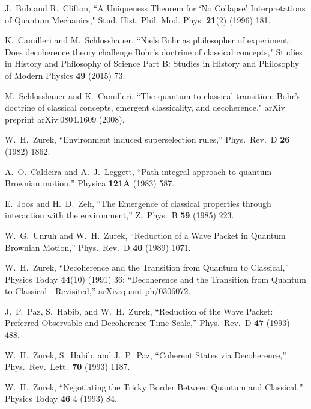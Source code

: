 \documentclass[12pt]{article}
\theoremstyle{plain}
\theoremstyle{definition}
\theoremstyle{remark}
\begin{document}
\begin{thebibliography}{99}
J.~Bub and R.~Clifton, ``A Uniqueness Theorem for `No Collapse' Interpretations of Quantum Mechanics," Stud. Hist. Phil. Mod. Phys. {\bf 21}(2) (1996) 181.


K.~Camilleri and M.~Schlosshauer, ``Niels Bohr as philosopher of experiment: Does decoherence theory challenge Bohr's doctrine of classical concepts," Studies in History and Philosophy of Science Part B: Studies in History and Philosophy of Modern Physics {\bf49} (2015) 73.
 
M.~Schlosshauer and K.~Camilleri. ``The quantum-to-classical transition: Bohr's doctrine of classical concepts, emergent classicality, and decoherence," arXiv preprint arXiv:0804.1609 (2008).
 

  
  W.~H.~Zurek,
  ``Environment induced superselection rules,''
  Phys.\ Rev.\ D {\bf 26} (1982) 1862.
 
  A.~O.~Caldeira and A.~J.~Leggett,
  ``Path integral approach to quantum Brownian motion,''
  Physica {\bf 121A} (1983) 587.

  E.~Joos and H.~D.~Zeh,
  ``The Emergence of classical properties through interaction with the environment,''
  Z.\ Phys.\ B {\bf 59} (1985) 223.
    
  W.~G.~Unruh and W.~H.~Zurek,
  ``Reduction of a Wave Packet in Quantum Brownian Motion,''
  Phys.\ Rev.\ D {\bf 40} (1989) 1071.
 

 W.~H.~Zurek, ``Decoherence and the Transition from
Quantum to Classical,'' Physics Today {\bf 44}(10) (1991) 36; ``Decoherence and the Transition from Quantum to
Classical---Revisited,'' arXiv:quant-ph/0306072.

J.~P.~Paz, S.~Habib, and W.~H.~Zurek, ``Reduction of the
Wave Packet: Preferred Observable and Decoherence Time Scale,'' Phys.\
Rev.\ D {\bf 47} (1993) 488.


W.~H.~Zurek, S.~Habib, and J.~P.~Paz, ``Coherent States
via Decoherence,'' Phys.\ Rev.\ Lett.\ {\bf 70} (1993) 1187.

W.~H.~Zurek, ``Negotiating the Tricky Border Between
Quantum and Classical,'' Physics Today {\bf 46} 4 (1993) 84.


\end{thebibliography}
\end{document}
